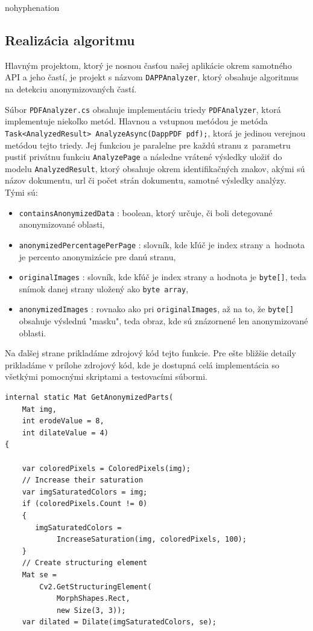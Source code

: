 \begin{hyphenrules}{nohyphenation}
\subsection{Realizácia algoritmu}
Hlavným projektom, ktorý je nosnou časťou našej aplikácie okrem samotného API a jeho častí, je projekt s názvom \texttt{DAPPAnalyzer}, ktorý obsahuje algoritmus na detekciu anonymizovaných častí.
\newline

Súbor \texttt{PDFAnalyzer.cs} obsahuje implementáciu triedy \texttt{PDFAnalyzer}, ktorá implementuje niekoľko metód. Hlavnou a vstupnou metódou je metóda \texttt{Task<AnalyzedResult> AnalyzeAsync(DappPDF pdf);}, ktorá je jedinou verejnou metódou tejto triedy. Jej funkciou je paralelne pre každú stranu z~parametru pustiť privátnu funkciu \texttt{AnalyzePage} a následne vrátené výsledky uložiť do modelu \texttt{AnalyzedResult}, ktorý obsahuje okrem identifikačných znakov, akými sú názov dokumentu, url či počet strán dokumentu, samotné výsledky analýzy. Tými sú:
\begin{itemize}
    \item \texttt{containsAnonymizedData} : boolean, ktorý určuje, či boli detegované anonymizované oblasti,
    \item \texttt{anonymizedPercentagePerPage} : slovník, kde kľúč je index strany a~hodnota je percento anonymizácie pre danú stranu,
    \item \texttt{originalImages} : slovník, kde kľúč je index strany a hodnota je \texttt{byte[]}, teda snímok danej strany uložený ako \texttt{byte array},
    \item \texttt{anonymizedImages} : rovnako ako pri \texttt{originalImages}, až na to, že \texttt{byte[]} obsahuje výslednú "masku", teda obraz, kde sú znázornené len anonymizované oblasti.
    
\end{itemize}

Na ďalšej strane prikladáme zdrojový kód tejto funkcie. Pre ešte bližšie detaily prikladáme v prílohe zdrojový kód, kde je dostupná celá implementácia so všetkými pomocnými skriptami a testovacími súbormi.
\newpage
\begin{lstlisting}
internal static Mat GetAnonymizedParts(
    Mat img, 
    int erodeValue = 8, 
    int dilateValue = 4)
{

    var coloredPixels = ColoredPixels(img);
    // Increase their saturation 
    var imgSaturatedColors = img;
    if (coloredPixels.Count != 0)
    {
       imgSaturatedColors = 
            IncreaseSaturation(img, coloredPixels, 100);
    }
    // Create structuring element
    Mat se = 
        Cv2.GetStructuringElement(
            MorphShapes.Rect, 
            new Size(3, 3));
    var dilated = Dilate(imgSaturatedColors, se);


\end{lstlisting}
\end{hyphenrules}
